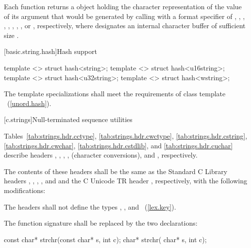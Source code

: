 \begin{itemdescr}
\pnum
\returns Each function returns a  object holding the character
representation of the value of its argument that would be generated by calling
 with a format specifier of
,
,
,
,
,
,
,
,
or , respectively, where  designates an
internal character buffer of sufficient size .
\end{itemdescr}

[basic.string.hash]{Hash support}

%
\begin{itemdecl}
template <> struct hash<string>;
template <> struct hash<u16string>;
template <> struct hash<u32string>;
template <> struct hash<wstring>;
\end{itemdecl}

\begin{itemdescr}
\pnum The template specializations shall meet the requirements of class template
~(\ref{unord.hash}).
\end{itemdescr}


[c.strings]{Null-terminated sequence utilities}

\pnum
Tables~\ref{tab:strings.hdr.cctype},
\ref{tab:strings.hdr.cwctype}, \ref{tab:strings.hdr.cstring},
\ref{tab:strings.hdr.cwchar},
\ref{tab:strings.hdr.cstdlib},
and \ref{tab:strings.hdr.cuchar}
describe headers
,
,
,
,
(character conversions),
 and
,
respectively.

\pnum
The contents of these headers shall be the same as the Standard C Library headers
,
,
,
,
and
and the C Unicode TR header ,
respectively, with the following modifications:

\pnum
{}%
The headers shall not define the types
, , and
~(\ref{lex.key}).

\pnum
{}%
The function signature
shall be replaced by the two declarations:

\begin{codeblock}
const char* strchr(const char* s, int c);
      char* strchr(      char* s, int c);
\end{codeblock}

